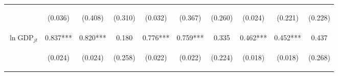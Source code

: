 \documentclass[twoside,a4paper,11pt]{article}
\begin{document}
\begin{table}
{\begin{tabular}{lccc|ccc|ccc}
		\vspace{4pt} & \begin{footnotesize}(0.036)\end{footnotesize} & \begin{footnotesize}(0.408)\end{footnotesize} & \begin{footnotesize}(0.310)\end{footnotesize} & \begin{footnotesize}(0.032)\end{footnotesize} & \begin{footnotesize}(0.367)\end{footnotesize} & \begin{footnotesize}(0.260)\end{footnotesize} & \begin{footnotesize}(0.024)\end{footnotesize} & \begin{footnotesize}(0.221)\end{footnotesize} & \begin{footnotesize}(0.228)\end{footnotesize} \\
		$\ln\text{GDP}_{jt}$ & 0.837*** & 0.820*** & 0.180 & 0.776*** & 0.759*** & 0.335 & 0.462*** & 0.452*** & 0.437 \\
		\vspace{4pt} & \begin{footnotesize}(0.024)\end{footnotesize} & \begin{footnotesize}(0.024)\end{footnotesize} & \begin{footnotesize}(0.258)\end{footnotesize} & \begin{footnotesize}(0.022)\end{footnotesize} & \begin{footnotesize}(0.022)\end{footnotesize} & \begin{footnotesize}(0.224)\end{footnotesize} & \begin{footnotesize}(0.018)\end{footnotesize} & \begin{footnotesize}(0.018)\end{footnotesize} & \begin{footnotesize}(0.268)\end{footnotesize} \\

\end{tabular}}
\end{table}
\end{document}
